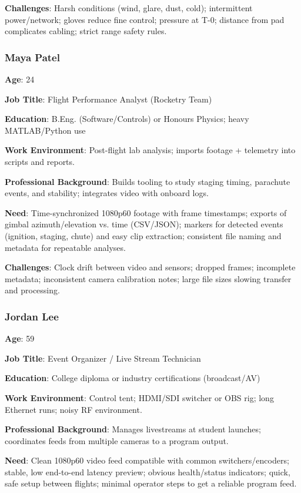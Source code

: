 \documentclass[12pt]{article}
\begin{document}
\textbf{Challenges}: Harsh conditions
(wind, glare, dust, cold); intermittent power/network; gloves reduce fine
control; pressure at T-0; distance from pad complicates cabling; strict range
safety rules.

\subsubsection*{Maya Patel}

\textbf{Age}: 24

\textbf{Job Title}: Flight Performance Analyst (Rocketry Team)

\textbf{Education}: B.Eng. (Software/Controls) or Honours Physics; heavy MATLAB/Python use

\textbf{Work Environment}: Post-flight lab analysis; imports footage + telemetry into scripts and reports.

\textbf{Professional Background}: Builds tooling to study staging timing, parachute events, and stability; integrates video with onboard logs.

\textbf{Need}: Time-synchronized 1080p60 footage with frame timestamps; exports of gimbal azimuth/elevation vs. time (CSV/JSON); markers for detected events (ignition, staging, chute) and easy clip extraction; consistent file naming and metadata for repeatable analyses.

\textbf{Challenges}: Clock drift between video and sensors; dropped frames; incomplete metadata; inconsistent camera calibration notes; large file sizes slowing transfer and processing.

\subsubsection*{Jordan Lee}

\textbf{Age}: 59

\textbf{Job Title}: Event Organizer / Live Stream Technician

\textbf{Education}: College diploma or industry certifications (broadcast/AV)

\textbf{Work Environment}: Control tent; HDMI/SDI switcher or OBS rig; long Ethernet runs; noisy RF environment.

\textbf{Professional Background}: Manages livestreams at student launches; coordinates feeds from multiple cameras to a program output.

\textbf{Need}: Clean 1080p60 video feed compatible with common switchers/encoders; stable, low end-to-end latency preview; obvious health/status indicators; quick, safe setup between flights; minimal operator steps to get a reliable program feed.
\end{document}
